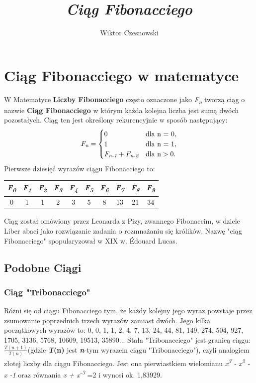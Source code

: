 \documentclass[12pt,a4paper]{article}
\title{\textit{Ciąg Fibonacciego}}
\author{Wiktor Czesnowski}
\begin{document}
\maketitle

\tableofcontents
\newpage
\section{\Large{Ciąg Fibonacciego w matematyce}}
W Matematyce \textbf{Liczby Fibonacciego} często oznaczone jako \textit{F\textsubscript{n}} tworzą ciąg o nazwie \textbf{Ciąg Fibonacciego} w którym każda kolejna liczba jest sumą dwóch pozostałych. Ciąg ten jest określony rekurencyjnie w sposób następujący: 
\[
	\textit{F\textsubscript{n}} =
\begin{cases}
	0 & \text{dla n = 0,}\\
	1 & \text{dla n = 1,}\\
	\textit{F\textsubscript{n-1}} + \textit{F\textsubscript{n-2}} & \text{dla n} > 0.
\end{cases}
\]
Pierwsze dziesięć wyrazów ciągu Fibonacciego to:
\begin{center}
\begin{tabular}{ |c| c| c| c| c| c| c| c| c| c|}
\hline 
\textit{F\textsubscript{0}} & \textit{F\textsubscript{1}} & \textit{F\textsubscript{2}} & \textit{F\textsubscript{3}} & \textit{F\textsubscript{4}} & \textit{F\textsubscript{5}} & \textit{F\textsubscript{6}} & \textit{F\textsubscript{7}} & \textit{F\textsubscript{8}} & \textit{F\textsubscript{9}} \\ 
\hline
0 & 1 & 1 & 2 & 3 & 5 & 8 & 13 & 21 & 34 \\
\hline
\end{tabular}
\end{center}
Ciąg został omówiony przez Leonarda z Pizy, zwannego Fibonaccim, w dziele Liber abaci jako rozwiązanie zadania o rozmnażaniu się królików. Nazwę "ciąg Fibonacciego" spopularyzował w XIX w. \'Edouard Lucas.%
\subsection{\large{Podobne Ciągi}}
\subsubsection{Ciąg "Tribonacciego"}
Różni się od ciągu Fibonacciego tym, że każdy kolejny jego wyraz powstaje przez zsumowanie poprzednich trzech wyrazów zamiast dwóch.
Jego kilka początkowych wyrazów to: 0, 0, 1, 1, 2, 4, 7, 13, 24, 44, 81, 149, 274, 504, 927, 1705, 3136, 5768, 10609, 19513, 35890...\newline\newline
Stała "Tribonacciego" jest granicą ciągu: $\mathit{\frac{T(n + 1)}{T(n)}}$(gdzie \textbf{\textit{T}(n)} jest \textit{\textbf{n}}-tym wyrazem ciągu "Tribonacciego"), czyli analogiem złotej liczby dla ciągu Fibonacciego. Jest ona pierwiastkiem wielomianu \textit{ x\textsuperscript{3} - x\textsuperscript{2} - x -1 } oraz równania\newline 
\textit{x +  x\textsuperscript{-3}} =2 i wynosi ok. 1,83929.
\end{document}
